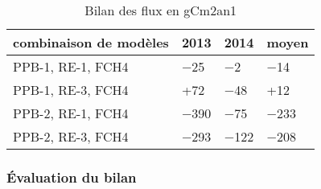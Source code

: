 \begin{table}
\centering
\caption{Bilan des flux en gCm2an1}
\label{table:bdc}
\begin{tabular}{llll}\toprule
combinaison de modèles & 2013 & 2014 & moyen \\ \midrule
PPB-1, RE-1, FCH4 &  \num{-25} & \num{-2} & \num{-14} \\
PPB-1, RE-3, FCH4 &  +\num{72} & \num{-48} & +\num{12} \\
PPB-2, RE-1, FCH4 &  \num{-390} & \num{-75} & \num{-233} \\
PPB-2, RE-3, FCH4 &  \num{-293} & \num{-122} & \num{-208} \\
\bottomrule
\end{tabular}
\end{table}


\subsubsection{Évaluation du bilan}

